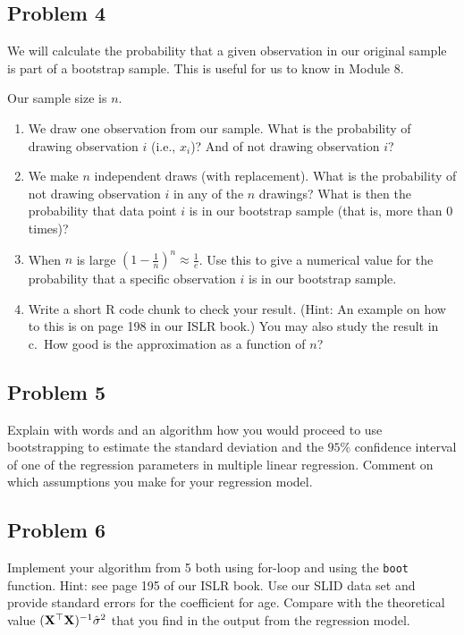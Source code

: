 \documentclass[
]{article}
\providecommand{\tightlist}{%
  \setlength{\itemsep}{0pt}\setlength{\parskip}{0pt}}
\begin{document}
\hypertarget{problem-4}{%
\subsection{Problem 4}\label{problem-4}}

We will calculate the probability that a given observation in our
original sample is part of a bootstrap sample. This is useful for us to
know in Module 8.

Our sample size is \(n\).

\begin{enumerate}
\def\labelenumi{\alph{enumi}.}
\tightlist
\item
  We draw one observation from our sample. What is the probability of
  drawing observation \(i\) (i.e., \(x_i\))? And of not drawing
  observation \(i\)?
\item
  We make \(n\) independent draws (with replacement). What is the
  probability of not drawing observation \(i\) in any of the \(n\)
  drawings? What is then the probability that data point \(i\) is in our
  bootstrap sample (that is, more than \(0\) times)?
\item
  When \(n\) is large \((1-\frac{1}{n})^n \approx \frac{1}{e}\). Use
  this to give a numerical value for the probability that a specific
  observation \(i\) is in our bootstrap sample.
\item
  Write a short R code chunk to check your result. (Hint: An example on
  how to this is on page 198 in our ISLR book.) You may also study the
  result in c.~How good is the approximation as a function of \(n\)?
\end{enumerate}

\hypertarget{problem-5}{%
\subsection{Problem 5}\label{problem-5}}

Explain with words and an algorithm how you would proceed to use
bootstrapping to estimate the standard deviation and the \(95\%\)
confidence interval of one of the regression parameters in multiple
linear regression. Comment on which assumptions you make for your
regression model.

\hypertarget{problem-6}{%
\subsection{Problem 6}\label{problem-6}}

Implement your algorithm from 5 both using for-loop and using the
\texttt{boot} function. Hint: see page 195 of our ISLR book. Use our
SLID data set and provide standard errors for the coefficient for age.
Compare with the theoretical value
\(({\bf X}^\top{\bf X})^{-1}\hat{\sigma}^2\) that you find in the output
from the regression model.
\end{document}
